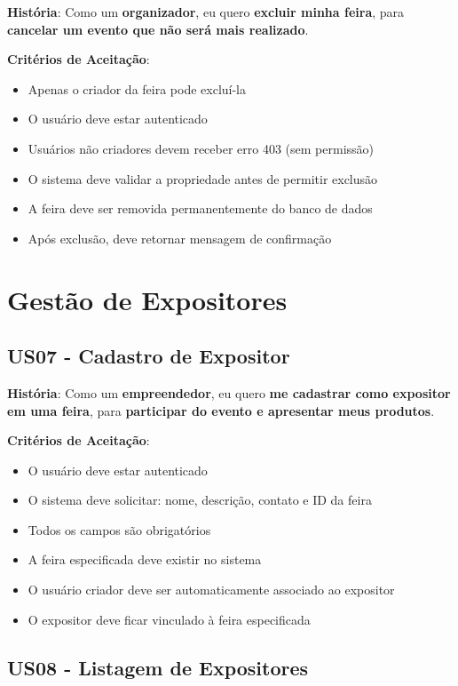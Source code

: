 \documentclass[12pt,a4paper]{article}
\begin{document}
\textbf{História}: Como um \textbf{organizador}, eu quero \textbf{excluir minha feira}, para \textbf{cancelar um evento que não será mais realizado}.

\textbf{Critérios de Aceitação}:
\begin{itemize}
    \item Apenas o criador da feira pode excluí-la
    \item O usuário deve estar autenticado
    \item Usuários não criadores devem receber erro 403 (sem permissão)
    \item O sistema deve validar a propriedade antes de permitir exclusão
    \item A feira deve ser removida permanentemente do banco de dados
    \item Após exclusão, deve retornar mensagem de confirmação
\end{itemize}

\section{Gestão de Expositores}

\subsection{US07 - Cadastro de Expositor}

\textbf{História}: Como um \textbf{empreendedor}, eu quero \textbf{me cadastrar como expositor em uma feira}, para \textbf{participar do evento e apresentar meus produtos}.

\textbf{Critérios de Aceitação}:
\begin{itemize}
    \item O usuário deve estar autenticado
    \item O sistema deve solicitar: nome, descrição, contato e ID da feira
    \item Todos os campos são obrigatórios
    \item A feira especificada deve existir no sistema
    \item O usuário criador deve ser automaticamente associado ao expositor
    \item O expositor deve ficar vinculado à feira especificada
\end{itemize}

\subsection{US08 - Listagem de Expositores}
\end{document}
